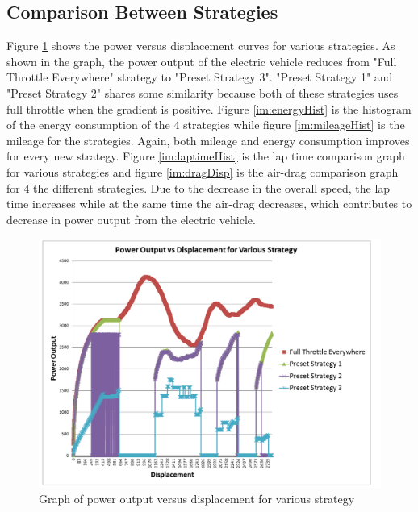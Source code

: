 \subsection{Comparison Between Strategies}

Figure \ref{im:powerDisp} shows the power versus displacement curves for various strategies. As shown in the graph, the power output of the electric vehicle reduces from "Full Throttle Everywhere" strategy to "Preset Strategy 3". "Preset Strategy 1" and "Preset Strategy 2" shares some similarity because both of these strategies uses full throttle when the gradient is positive. Figure \ref{im:energyHist} is the histogram of the energy consumption of the 4 strategies while figure \ref{im:mileageHist} is the mileage for the strategies. Again, both mileage and energy consumption improves for every new strategy. Figure \ref{im:laptimeHist} is the lap time comparison graph for various strategies and figure \ref{im:dragDisp} is the air-drag comparison graph for 4 the different strategies. Due to the decrease in the overall speed, the lap time increases while at the same time the air-drag decreases, which contributes to decrease in power output from the electric vehicle. 

\begin{figure}[htb]
	\centering
	\includegraphics[width=5in]{images/power.png}
	\caption{Graph of power output versus displacement for various strategy}
	\label{im:powerDisp}
\end{figure}

